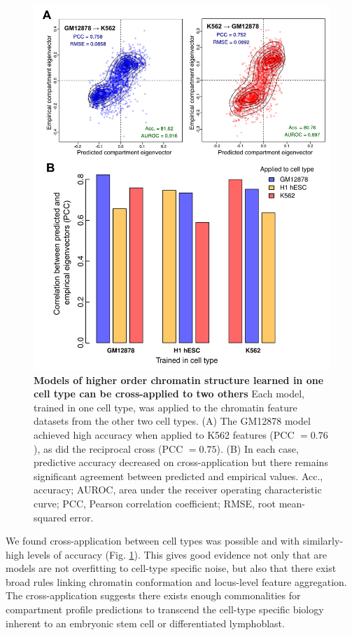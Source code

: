 \documentclass[a4paper,11pt,oneside]{book}
\begin{document}
\begin{figure}
\begin{center} 
\includegraphics[width=.7\textwidth]{figs/xapp.pdf}
\captionsetup{width=\textwidth} 
\caption{ {\bf Models of higher order chromatin structure learned in one cell type can be cross-applied to two others }
 Each model, trained in one cell type, was applied to the chromatin feature datasets from the other two cell types. (A) The GM12878 model achieved high accuracy when applied to K562 features (PCC $= 0.76$), as did the reciprocal cross (PCC $= 0.75$). (B) In each case, predictive accuracy decreased on cross-application but there remains significant agreement between predicted and empirical values. Acc., accuracy; AUROC, area under the receiver operating characteristic curve; PCC, Pearson correlation coefficient; RMSE, root mean-squared error.
}\label{fig:xapp}
\end{center} 
\end{figure} 

We found cross-application between cell types was possible and with similarly-high levels of accuracy (Fig. \ref{fig:xapp}). This gives good evidence not only that are models are not overfitting to cell-type specific noise, but also that there exist broad rules linking chromatin conformation and locus-level feature aggregation. The cross-application suggests there exists enough commonalities for compartment profile predictions to transcend the cell-type specific biology inherent to an embryonic stem cell or differentiated lymphoblast.
\end{document}
